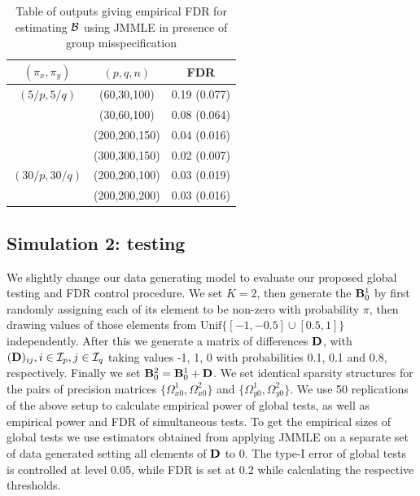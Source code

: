 \begin{scriptsize}
\begin{table}[t]
\centering
    \begin{tabular}{ccc}
    \hline
    $(\pi_x, \pi_y)$ & $(p,q,n)$   & FDR          \\\hline
    $(5/p, 5/q)$   & (60,30,100)   & 0.19 (0.077) \\
    ~              & (30,60,100)   & 0.08 (0.064) \\
    ~              & (200,200,150) & 0.04 (0.016) \\
    ~              & (300,300,150) & 0.02 (0.007) \\\hline
    $(30/p, 30/q)$ & (200,200,100) & 0.03 (0.019) \\
    ~              & (200,200,200) & 0.03 (0.016) \\\hline
    \end{tabular}
    \caption{Table of outputs giving empirical FDR for estimating ${\cal{B}}$ using JMMLE in presence of group misspecification}
    \label{table:simtable22}
\end{table}
\end{scriptsize}

\subsection{Simulation 2: testing}
\label{sec:eval-testing}
We slightly change our data generating model to evaluate our proposed global testing and FDR control procedure. We set $K=2$, then generate the ${\mathbf{B}}_0^1$ by first randomly assigning each of its element to be non-zero with probability $\pi$, then drawing values of those elements from $\text{Unif}\{ [ -1, -0.5] \cup [0.5,1]\}$ independently. After this we generate a matrix of differences ${\mathbf{D}}$, with $({\mathbf{D}})_{ij}, i \in {\cal{I}}_p, j \in {\cal{I}}_q$ taking values -1, 1, 0 with probabilities 0.1, 0.1 and 0.8, respectively. Finally we set ${\mathbf{B}}_0^2 = {\mathbf{B}}_0^1 + {\mathbf{D}}$. We set identical sparsity structures for the pairs of precision matrices $\{ \Omega_{x0}^1, \Omega_{x0}^2 \}$ and $\{ \Omega_{y0}^1, \Omega_{y0}^2 \}$. We use 50 replications of the above setup to calculate empirical power of global tests, as well as empirical power and FDR of simultaneous tests. To get the empirical sizes of global tests we use estimators obtained from applying JMMLE on a separate set of data generated setting all elements of ${\mathbf{D}}$ to 0. The type-I error of global tests is controlled at level 0.05, while FDR is set at 0.2 while calculating the respective thresholds.

